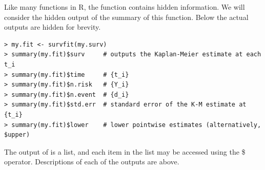 \documentclass[11pt]{article}
\begin{document}


Like many functions in R, the  function contains hidden information. We will consider the hidden output of the summary of this function. Below the actual outputs are hidden for brevity.
\begin{verbatim}
> my.fit <- survfit(my.surv)
> summary(my.fit)$surv     # outputs the Kaplan-Meier estimate at each t_i
> summary(my.fit)$time     # {t_i}
> summary(my.fit)$n.risk   # {Y_i}
> summary(my.fit)$n.event  # {d_i}
> summary(my.fit)$std.err  # standard error of the K-M estimate at {t_i}
> summary(my.fit)$lower    # lower pointwise estimates (alternatively, $upper)
\end{verbatim}
The output of  is a list, and each item in the list may be accessed using the \$ operator. Descriptions of each of the outputs are above.
\end{document}
